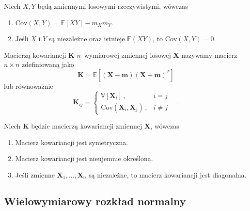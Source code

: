 \documentclass{myclass}
\numberwithin{equation}{subsection}
\begin{document}
\begin{theorem}
Niech \(X, Y\) będą zmiennymi losowymi rzeczywistymi, wówczas

\begin{enumerate}

    \item \(\mathrm{Cov}(X, Y) = \mathbb{E}[XY] - m_X m_Y\).
    
    \item Jeśli \(X\) i \(Y\) są niezależne oraz istnieje \(\mathbb{E}(XY)\), to \(\mathrm{Cov}(X,Y)
    = 0\).
\end{enumerate}
\end{theorem}

\begin{definition}\label{def:covmat}
Macierzą kowariancji \(\mathbf{K}\) \(n\)--wymiarowej zmiennej losowej \(\mathbf{X}\) nazywamy
macierz \(n \times n\) zdefiniowaną jako
\begin{equation*}
    \mathbf{K} = \mathbb{E}[(\mathbf{X} - \mathbf{m})(\mathbf{X} - \mathbf{m})^T]
\end{equation*}
lub równoważnie
\begin{equation*}
    \mathbf{K}_{ij} = \begin{cases}
        \mathbb{V}[\mathbf{X}_i]\,,&i=j\\
        \mathrm{Cov}(\mathbf{X}_i, \mathbf{X}_j)\,,&i\neq j
    \end{cases}\quad.
\end{equation*}
\end{definition}

\begin{theorem}\label{th:covmat}
Niech \(\mathbf{K}\) będzie macierzą kowariancji zmiennej \(\mathbf{X}\), wówczas
\begin{enumerate}

    \item Macierz kowariancji jest symetryczna.

    \item Macierz kowariancji jest nieujemnie określona.

    \item Jeśli zmienne \(\mathbf{X}_1,\ldots,\mathbf{X}_n\) są niezależne, to macierz kowariancji
    jest diagonalna.
    
\end{enumerate}
\end{theorem}


\subsection{Wielowymiarowy rozkład normalny}
\end{document}
